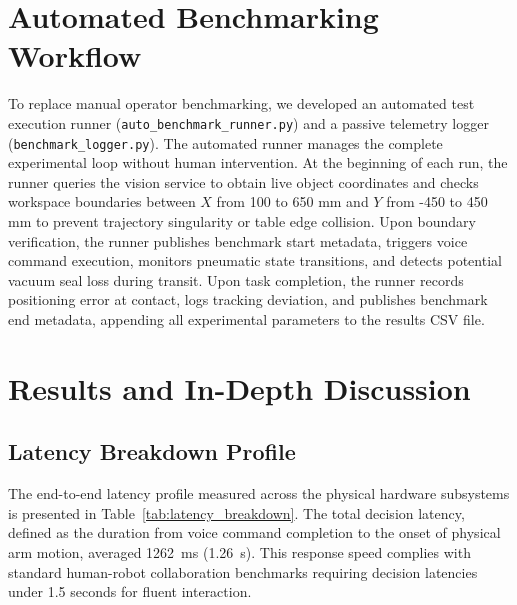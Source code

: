 \documentclass[runningheads]{llncs}
\begin{document}
\section{Automated Benchmarking Workflow}
\label{sec:benchmark_workflow}

To replace manual operator benchmarking, we developed an automated test execution runner (\texttt{auto\_benchmark\_runner.py}) and a passive telemetry logger (\texttt{benchmark\_logger.py}). The automated runner manages the complete experimental loop without human intervention. At the beginning of each run, the runner queries the vision service to obtain live object coordinates and checks workspace boundaries between $X$ from 100 to 650 mm and $Y$ from -450 to 450 mm to prevent trajectory singularity or table edge collision. Upon boundary verification, the runner publishes benchmark start metadata, triggers voice command execution, monitors pneumatic state transitions, and detects potential vacuum seal loss during transit. Upon task completion, the runner records positioning error at contact, logs tracking deviation, and publishes benchmark end metadata, appending all experimental parameters to the results CSV file.

\section{Results and In-Depth Discussion}
\label{sec:results}

\subsection{Latency Breakdown Profile}
The end-to-end latency profile measured across the physical hardware subsystems is presented in Table~\ref{tab:latency_breakdown}. The total decision latency, defined as the duration from voice command completion to the onset of physical arm motion, averaged \SI{1262}{\milli\second} (\SI{1.26}{\second}). This response speed complies with standard human-robot collaboration benchmarks requiring decision latencies under 1.5 seconds for fluent interaction.
\end{document}
